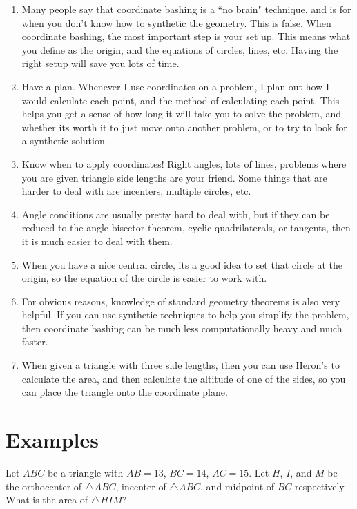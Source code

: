 \documentclass{article}
\begin{document}
\begin{enumerate}
    \item Many people say that coordinate bashing is a ``no brain" technique, and is for when you don't know how to synthetic the geometry. This is false. When coordinate bashing, the most important step is your set up. This means what you define as the origin, and the equations of circles, lines, etc. Having the right setup will save you lots of time.
    \item Have a plan. Whenever I use coordinates on a problem, I plan out how I would calculate each point, and the method of calculating each point. This helps you get a sense of how long it will take you to solve the problem, and whether its worth it to just move onto another problem, or to try to look for a synthetic solution. 
    \item Know when to apply coordinates! Right angles, lots of lines, problems where you are given triangle side lengths are your friend. Some things that are harder to deal with are incenters, multiple circles, etc.
    \item Angle conditions are usually pretty hard to deal with, but if they can be reduced to the angle bisector theorem, cyclic quadrilaterals, or tangents, then it is much easier to deal with them. 
    \item When you have a nice central circle, its a good idea to set that circle at the origin, so the equation of the circle is easier to work with.
    \item For obvious reasons, knowledge of standard geometry theorems is also very helpful. If you can use synthetic techniques to help you simplify the problem, then coordinate bashing can be much less computationally heavy and much faster. 
    \item When given a triangle with three side lengths, then you can use Heron's to calculate the area, and then calculate the altitude of one of the sides, so you can place the triangle onto the coordinate plane. 
\end{enumerate}

\section{Examples}

\begin{exam}
Let $ABC$ be a triangle with $AB=13$, $BC=14$, $AC=15$. Let $H$, $I$, and $M$ be the orthocenter of $\triangle ABC$, incenter of $\triangle ABC$, and midpoint of $BC$ respectively. What is the area of $\triangle HIM$?
\end{exam}
\end{document}
